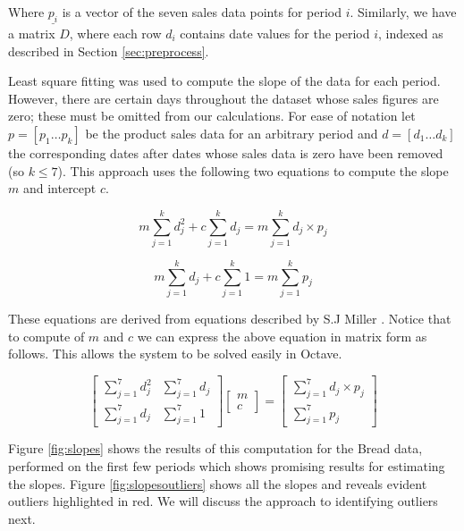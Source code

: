 Where $\underline{p_i}$ is a vector of the seven sales data points for period $i$. Similarly, we have a matrix $D$, where each row $d_i$ contains date values for the period $i$, indexed as described in Section \ref{sec:preprocess}.

Least square fitting was used to compute the slope of the data for each period. However, there are certain days throughout the dataset whose sales figures are zero; these must be omitted from our calculations. For ease of notation let $p = [p_1 \dots p_k]$ be the product sales data for an arbitrary period and $d = [d_1 \dots d_k]$ the corresponding dates after dates whose sales data is zero have been removed (so $k \leq 7$). This approach uses the following two equations to compute the slope $m$ and intercept $c$. 

$$
m\sum_{j = 1}^{k} d_{j}^2 + c\sum_{j = 1}^{k} d_{j} = m\sum_{j = 1}^{k} d_{j} \times p_{j}
$$

$$
m\sum_{j = 1}^{k} d_{j} + c\sum_{j = 1}^{k} 1 = m\sum_{j = 1}^{k}  p_{j}
$$

These equations are derived from equations described by S.J Miller \cite{squares}. Notice that to compute of $m$ and $c$ we can express the above equation in matrix form as follows. This allows the system to be solved easily in Octave.

\[
\begin{bmatrix}
\sum_{j = 1}^{7} d_{j}^2 & \sum_{j = 1}^{7} d_{j} \\
\sum_{j = 1}^{7} d_{j} & \sum_{j = 1}^{7} 1
\end{bmatrix}
\begin{bmatrix}
m\\
c
\end{bmatrix}
=
\begin{bmatrix}
\sum_{j = 1}^{7} d_{j} \times p_{j}\\
\sum_{j = 1}^{7}  p_{j}
\end{bmatrix}
\]

Figure \ref{fig:slopes} shows the results of this computation for the Bread data, performed on the first few periods which shows promising results for estimating the slopes. Figure \ref{fig:slopesoutliers} shows all the slopes and reveals evident outliers highlighted in red. We will discuss the approach to identifying outliers next.



